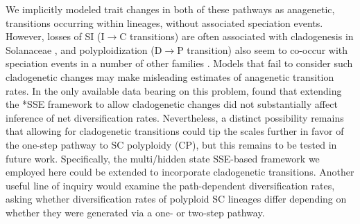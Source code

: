 We implicitly modeled trait changes in both of these pathways as anagenetic, transitions occurring within lineages, without associated speciation events.
However, losses of SI (I$\rightarrow$C transitions) are often associated with cladogenesis in Solanaceae \citep{goldberg_2012}, and polyploidization (D$\rightarrow$P transition) also seem to co-occur with speciation events in a number of other families \citep{zhan_2016,freyman_2017}.
Models that fail to consider such cladogenetic changes may make misleading estimates of anagenetic transition rates.
In the only available data bearing on this problem, \citet{goldberg_2012} found that extending the *SSE framework to allow cladogenetic changes did not substantially affect inference of net diversification rates.
Nevertheless, a distinct possibility remains that allowing for cladogenetic transitions could tip the scales further in favor of the one-step pathway to SC polyploidy (CP), but this remains to be tested in future work. %
Specifically, the multi/hidden state SSE-based framework we employed here could be extended to incorporate cladogenetic transitions. %
Another useful line of inquiry would examine the path-dependent diversification rates, asking whether diversification rates of polyploid SC lineages differ depending on whether they were generated via a one- or two-step pathway. %
%
%
%
%

